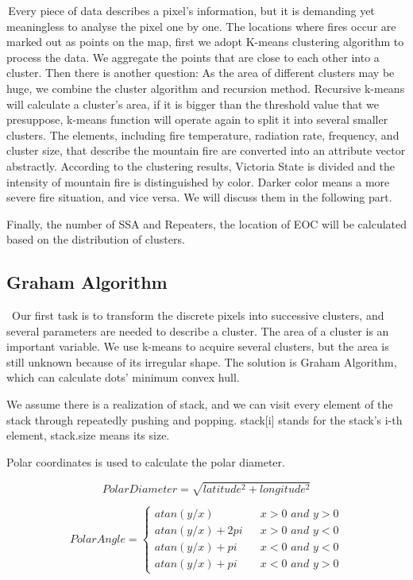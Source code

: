 \documentclass{mcmthesis}
\begin{document}
\quad \,Every piece of data describes a pixel’s information, but it is demanding yet meaningless to analyse the pixel one by one. The locations where fires occur are marked out as points on the map, first we adopt K-means clustering algorithm to process the data. We aggregate the points that are close to each other into a cluster. Then there is another question: As the area of different clusters may be huge, we combine the cluster algorithm and recursion method. Recursive k-means will calculate a cluster’s area, if it is bigger than the threshold value that we presuppose, k-means function will operate again to split it into several smaller clusters.
The elements, including fire temperature, radiation rate, frequency, and cluster size, that describe the mountain fire are converted into an attribute vector abstractly. According to the clustering results, Victoria State is divided and the intensity of mountain fire is distinguished by color. Darker color means a more severe fire situation, and vice versa. We will discuss them in the following part. 

Finally, the number of SSA and Repeaters, the location of EOC will be calculated based on the distribution of clusters.



\subsection{Graham Algorithm}
\quad \, Our first task is to transform the discrete pixels into successive clusters, and several parameters are needed to describe a cluster. The area of a cluster is an important variable. We use k-means to acquire several clusters, but the area is still unknown because of its irregular shape. The  solution is Graham Algorithm, which can calculate dots’ minimum convex hull.\cite{gholami2019droneassisted}

We assume there is a realization of stack, and we can visit every element of the stack through repeatedly pushing and popping. stack[i] stands for the stack’s i-th element, stack.size means its size.

Polar coordinates is used to calculate the polar diameter.

\begin{equation}
		Polar Diameter = \sqrt{latitude^2+longitude^2}
\end{equation}

\begin{equation}
	Polar Angle=\left\{
	\begin{array}{rcl}
		atan(y/x) & & {x > 0 \,\,and\,\, y > 0}\\
		atan(y/x)+2pi & & {x > 0 \,\,and\,\, y < 0}\\
		atan(y/x)+pi & & {x < 0 \,\,and\,\, y < 0}\\
		atan(y/x)+pi & & {x < 0 \,\,and\,\, y > 0}
	\end{array} \right.
\end{equation}
\end{document}
